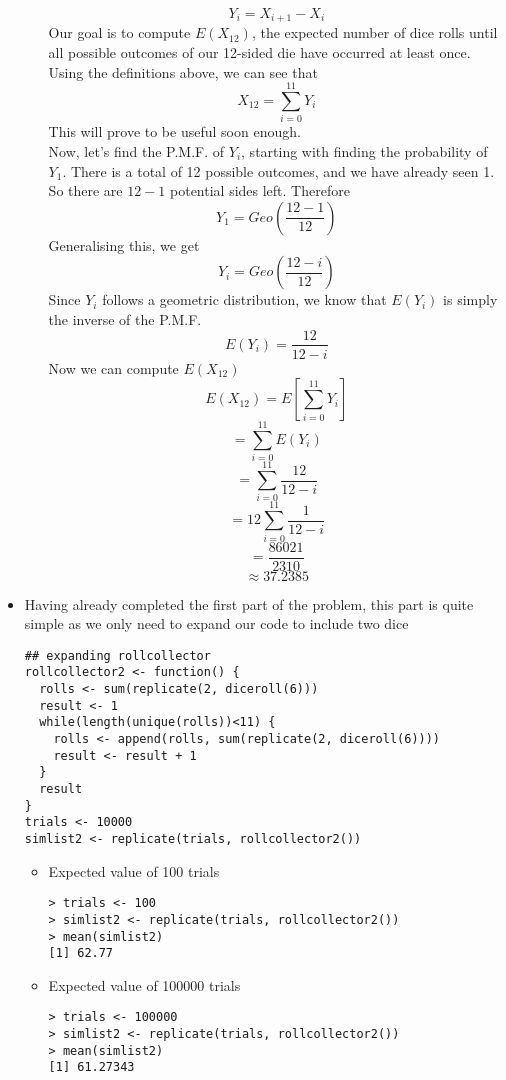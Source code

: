 \documentclass{article}
\begin{document}
\begin{itemize}
\begin{itemize}
        \[Y_i = X_{i+1}-X_i\]
        Our goal is to compute \(E(X_{12})\), the expected number of dice rolls until all possible outcomes of our 12-sided die have occurred at least once. Using the definitions above, we can see that
        \[X_{12} = \sum_{i=0}^{11} Y_i\]
        This will prove to be useful soon enough.\\
        Now, let's find the P.M.F. of \(Y_i\), starting with finding the probability of \(Y_1\). There is a total of 12 possible outcomes, and we have already seen 1. So there are \(12-1\) potential sides left. Therefore
        \[Y_1 = Geo(\frac{12-1}{12})\]
        Generalising this, we get
        \[Y_i = Geo(\frac{12-i}{12})\]
        Since \(Y_i\) follows a geometric distribution, we know that \(E(Y_i)\) is simply the inverse of the P.M.F.
        \[E(Y_i) = \frac{12}{12-i}\]
        Now we can compute \(E(X_{12})\)
        \[E(X_{12}) = E[\sum_{i=0}^{11} Y_i]\]
        \[= \sum_{i=0}^{11}E( Y_i)\]
        \[= \sum_{i=0}^{11}\frac{12}{12-i}\]
        \[= 12\sum_{i=0}^{11}\frac{1}{12-i}\]
        \[= \frac{86021}{2310}\]
        \[\approx 37.2385\]
            \end{itemize}
        \item
        Having already completed the first part of the problem, this part is quite simple as we only need to expand our code to include two dice
            \begin{verbatim}
## expanding rollcollector 
rollcollector2 <- function() {
  rolls <- sum(replicate(2, diceroll(6)))
  result <- 1
  while(length(unique(rolls))<11) {
    rolls <- append(rolls, sum(replicate(2, diceroll(6))))
    result <- result + 1
  }
  result
}
trials <- 10000
simlist2 <- replicate(trials, rollcollector2())
            \end{verbatim}
            \begin{itemize}
                \item Expected value of 100 trials
                \begin{verbatim}
> trials <- 100
> simlist2 <- replicate(trials, rollcollector2())
> mean(simlist2)
[1] 62.77       
                \end{verbatim}
                \item Expected value of 100000 trials
                \begin{verbatim}
> trials <- 100000
> simlist2 <- replicate(trials, rollcollector2())
> mean(simlist2)
[1] 61.27343
                \end{verbatim}
            \end{itemize}
    \end{itemize}
         
\end{document}
